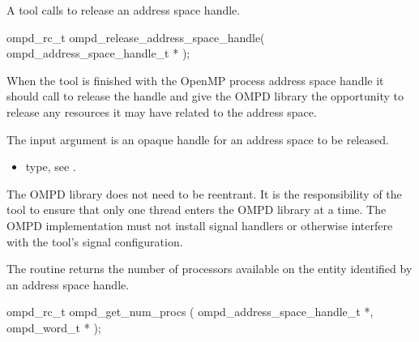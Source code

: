 \label{ompd:ompd_release_address_space_handle}
\summary
A tool calls  to release an address space 
handle.

\format

\begin{cspecific}
\begin{ompSyntax}
ompd_rc_t ompd_release_address_space_handle(
  ompd_address_space_handle_t *
);
\end{ompSyntax}
\end{cspecific}


\descr
When the tool is finished with the OpenMP process address space handle it
should call  to release
the handle and give the OMPD library the opportunity to release
any resources it may have related to the address space.

\argdesc
The input argument  is an opaque handle for an address space
to be released.

\crossreferences	
\begin{itemize}
	\item {} type, see 
	.
\end{itemize}


The OMPD library does not need to be reentrant. It is the responsibility 
of the tool to ensure that only one thread enters the OMPD library at a time. The OMPD 
implementation must not install signal handlers or otherwise interfere with the tool's signal 
configuration.



\label{ompd:ompd_get_num_procs}
\summary
The  routine returns the number of processors
available on the entity identified by an address space handle.

\format

\begin{cspecific}
\begin{ompSyntax}
ompd_rc_t ompd_get_num_procs (
  ompd_address_space_handle_t *,
  ompd_word_t *
);
\end{ompSyntax}
\end{cspecific}


